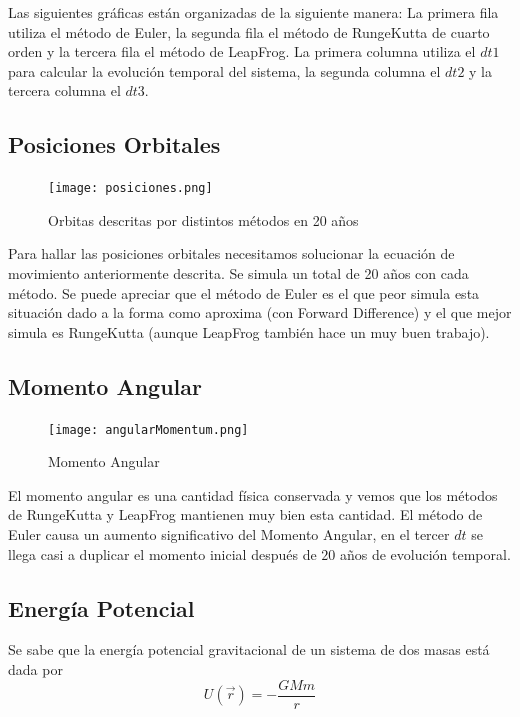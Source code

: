 \documentclass{article}
\begin{document}
Las siguientes gr\'aficas est\'an organizadas de la siguiente manera: La primera fila utiliza el m\'etodo de Euler, la segunda fila el m\'etodo de RungeKutta de cuarto orden y la tercera fila el m\'etodo de LeapFrog. La primera columna utiliza el $dt1$ para calcular la evoluci\'on temporal del sistema, la segunda columna el $dt2$ y la tercera columna el $dt3$.

\subsection*{Posiciones Orbitales}

\begin{figure}[!htbp]
 \centering
  \texttt{[image: posiciones.png]}
  \caption{Orbitas descritas por distintos m\'etodos en 20 a\~nos }
\end{figure}
Para hallar las posiciones orbitales necesitamos solucionar la ecuaci\'on de movimiento anteriormente descrita. Se simula un total de 20 a\~nos con cada m\'etodo.
Se puede apreciar que el m\'etodo de Euler es el que peor simula esta situaci\'on dado a la forma como aproxima (con Forward Difference) y el que mejor simula es RungeKutta (aunque LeapFrog tambi\'en hace un muy buen trabajo).

\subsection*{Momento Angular}

\begin{figure}[!htbp]
 \centering
  \texttt{[image: angularMomentum.png]}
  \caption{Momento Angular}
\end{figure}

El momento angular es una cantidad f\'isica conservada y vemos que los m\'etodos de RungeKutta y LeapFrog mantienen muy bien esta cantidad. El m\'etodo de Euler causa un aumento significativo del Momento Angular, en el tercer $dt$ se llega casi a duplicar el momento inicial despu\'es de $20$ a\~nos de evoluci\'on temporal. 

\subsection*{Energ\'ia Potencial}


Se sabe que la energ\'ia potencial gravitacional de un sistema de dos masas est\'a dada por 
\begin{equation*}
    U(\Vec{r}) = -\frac{GMm}{r} 
\end{equation*}
\end{document}
